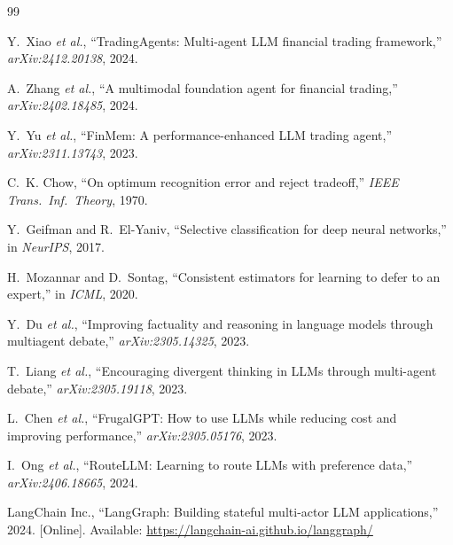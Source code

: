 \documentclass[conference]{IEEEtran}
\begin{document}
\begin{thebibliography}{99}\footnotesize

Y.~Xiao \emph{et al.},
``TradingAgents: Multi-agent LLM financial trading framework,''
\emph{arXiv:2412.20138}, 2024.

A.~Zhang \emph{et al.},
``A multimodal foundation agent for financial trading,''
\emph{arXiv:2402.18485}, 2024.

Y.~Yu \emph{et al.},
``FinMem: A performance-enhanced LLM trading agent,''
\emph{arXiv:2311.13743}, 2023.

C.~K. Chow,
``On optimum recognition error and reject tradeoff,''
\emph{IEEE Trans.\ Inf.\ Theory}, 1970.

Y.~Geifman and R.~El-Yaniv,
``Selective classification for deep neural networks,''
in \emph{NeurIPS}, 2017.

H.~Mozannar and D.~Sontag,
``Consistent estimators for learning to defer to an expert,''
in \emph{ICML}, 2020.

Y.~Du \emph{et al.},
``Improving factuality and reasoning in language models through
multiagent debate,'' \emph{arXiv:2305.14325}, 2023.

T.~Liang \emph{et al.},
``Encouraging divergent thinking in LLMs through multi-agent
debate,'' \emph{arXiv:2305.19118}, 2023.

L.~Chen \emph{et al.},
``FrugalGPT: How to use LLMs while reducing cost and improving
performance,'' \emph{arXiv:2305.05176}, 2023.

I.~Ong \emph{et al.},
``RouteLLM: Learning to route LLMs with preference data,''
\emph{arXiv:2406.18665}, 2024.

LangChain Inc.,
``LangGraph: Building stateful multi-actor LLM applications,''
2024. [Online]. Available:
\url{https://langchain-ai.github.io/langgraph/}

\end{thebibliography}
\end{document}
